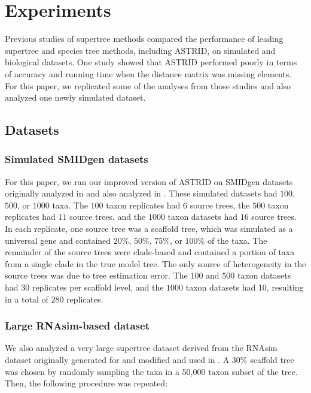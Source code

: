 \section{Experiments}

Previous studies of supertree methods \cite{fastrfs,smidgen} compared the performance of leading supertree and species tree methods, including ASTRID, on simulated and biological datasets. 
One study \cite{fastrfs} showed that ASTRID performed poorly in terms of accuracy and running time when the distance matrix was missing elements. For this paper, we replicated some of the analyses from those studies and also analyzed one newly simulated dataset.

\subsection{Datasets}

\subsubsection{Simulated SMIDgen datasets}
For this paper, we ran our improved version of ASTRID on SMIDgen datasets originally analyzed in \cite{smidgen} and also analyzed in \cite{fastrfs}. These simulated datasets had $100$, $500$, or $1000$ taxa. The $100$ taxon replicates had $6$ source trees, the $500$ taxon replicates had $11$ source trees, and the $1000$ taxon datasets had $16$ source trees. In each replicate, one source tree was a scaffold tree, which was simulated as a universal gene and contained $20\%$, $50\%$, $75\%$, or $100\%$ of the taxa. The remainder of the source trees were clade-based and contained a portion of taxa from a single clade in the true model tree. The only source of heterogeneity in the source trees was due to tree estimation error. The $100$ and $500$ taxon datasets had 30 replicates per scaffold level, and the $1000$ taxon datasets had 10, resulting in a total of $280$ replicates.

\subsubsection{Large RNAsim-based dataset}
We also analyzed a very large supertree dataset derived from the RNAsim dataset originally generated for \cite{guo2009large} and modified and used in \cite{mirarab2015pasta}. A 30\% scaffold tree was chosen by randomly sampling the taxa in a 50,000 taxon subset of the tree. Then, the following procedure was repeated: 

